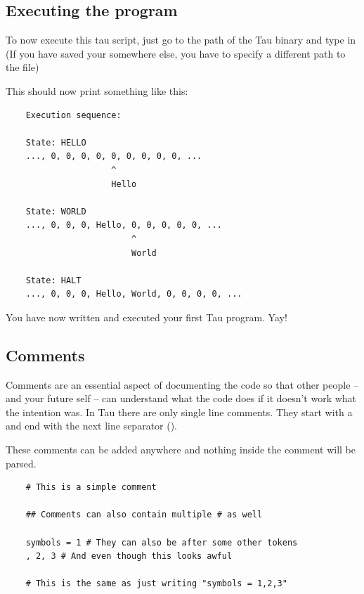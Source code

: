 \subsection{Executing the program}
To now execute this tau script, just go to the path of the Tau binary and type in  
(If you have saved your  somewhere else, you have to specify a different path to the file)

This should now print something like this:
\begin{verbatim}
    Execution sequence:

    State: HELLO
    ..., 0, 0, 0, 0, 0, 0, 0, 0, 0, ...
                     ^
                     Hello

    State: WORLD
    ..., 0, 0, 0, Hello, 0, 0, 0, 0, 0, ...
                         ^
                         World

    State: HALT
    ..., 0, 0, 0, Hello, World, 0, 0, 0, 0, ...
\end{verbatim}

You have now written and executed your first Tau program. Yay!

\subsection{Comments}
Comments are an essential aspect of documenting the code so that other people -- and your future self -- can understand what the code does
if it doesn't work what the intention was.
In Tau there are only single line comments. They start with a \code{\#} and end with the next line separator ().

These comments can be added anywhere and nothing inside the comment will be parsed.

\begin{verbatim}
    # This is a simple comment

    ## Comments can also contain multiple # as well

    symbols = 1 # They can also be after some other tokens
    , 2, 3 # And even though this looks awful

    # This is the same as just writing "symbols = 1,2,3"
\end{verbatim}
